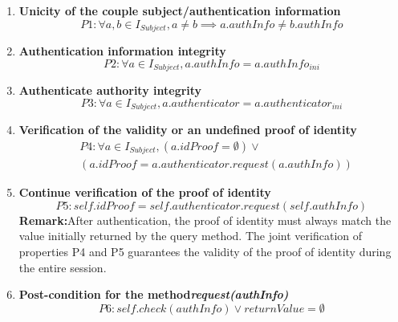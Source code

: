 \begin{enumerate}
    \item \textbf{Unicity of the couple subject/authentication information}
    \begin{equation*}
        P1: \forall a, b \in I_{Subject}, a \ne b \implies a.authInfo \ne b.authInfo
    \end{equation*}
    
    \item \textbf{Authentication information integrity }
    \begin{equation*}
        P2: \forall a \in I_{Subject}, a.authInfo = a.authInfo_{ini}
    \end{equation*}
    
    \item \textbf{Authenticate authority integrity}
    \begin{equation*}
        P3: \forall a \in I_{Subject}, a.authenticator = a.authenticator_{ini}
    \end{equation*}

    \item \textbf{Verification of the validity or an undefined proof of identity}
    \begin{equation*}
      \begin{split}
        &P4: \forall a \in I_{Subject}, (a.idProof = \emptyset) \lor \\&(a.idProof = a.authenticator.request(a.authInfo))
      \end{split}
    \end{equation*}

    \item \textbf{Continue verification of the proof of identity}
    \begin{equation*}
        P5: self.idProof = self.authenticator.request(self.authInfo)
    \end{equation*}
\textbf{Remark:}After authentication, the proof of identity must always match the value initially returned by the query method. The joint verification of properties P4 and P5 guarantees the validity of the proof of identity during the entire session.

    \item \textbf{Post-condition for the method\textit{request(authInfo)}}
    \begin{equation*}
        P6: self.check(authInfo) \lor returnValue = \emptyset
    \end{equation*}
 \end{enumerate}


